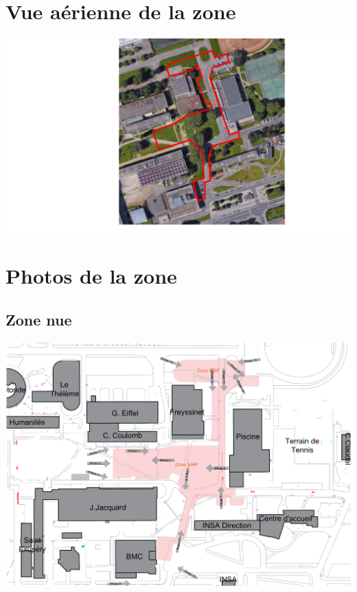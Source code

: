 \documentclass[hidelinks, paper=a4, fontsize=13pt]{report}
\begin{document}
\section{Vue aérienne de la zone}

\begin{center}
	\includegraphics[width=.8\textwidth,keepaspectratio]{Exports/ERP_vue_aerienne.pdf}
\end{center}
\newpage
\section{Photos de la zone}
\subsection{Zone nue}
\begin{center}
	\includegraphics[angle=90,width=.8\textwidth,keepaspectratio]{Exports/Plan_24h_44eme-Photos_Zone}
\end{center}
\end{document}
